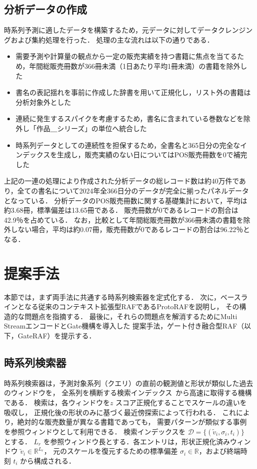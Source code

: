 \documentclass[twocolumn, lastpage]{jarticle}
\begin{document}
\subsection{分析データの作成}
時系列予測に適したデータを構築するため，元データに対してデータクレンジングおよび集約処理を行った．
処理の主な流れは以下の通りである．
    \begin{itemize}
        \item 需要予測や計算量の観点から一定の販売実績を持つ書籍に焦点を当てるため，年間総販売冊数が366冊未満（1日あたり平均1冊未満）の書籍を除外した
        \item 書名の表記揺れを事前に作成した辞書を用いて正規化し，リスト外の書籍は分析対象外とした
        \item 連続に発生するスパイクを考慮するため，書名に含まれている巻数などを除外し「作品＿シリーズ」の単位へ統合した
        \item 時系列データとしての連続性を担保するため，全書名と365日分の完全なインデックスを生成し，販売実績のない日についてはPOS販売冊数を0で補完した
    \end{itemize}
上記の一連の処理により作成された分析データの総レコード数は約40万件であり，全ての書名について2024年全366日分のデータが完全に揃ったパネルデータとなっている．
分析データのPOS販売冊数に関する基礎集計において，平均は約3.68冊，標準偏差は13.65冊である．
販売冊数が0であるレコードの割合は42.9％を占めている．
なお，比較として年間総販売冊数が366冊未満の書籍を除外しない場合，平均は約0.07冊，販売冊数が0であるレコードの割合は96.22％となる．





\section{提案手法}
本節では，まず両手法に共通する時系列検索器を定式化する．
次に，ベースラインとなる従来のコンテキスト拡張型RAFであるProtoRAFを説明し，
その構造的な問題点を指摘する．
最後に，それらの問題点を解消するためにMulti StreamエンコードとGate機構を導入した
提案手法，ゲート付き融合型RAF（以下，GateRAF）を提示する．


\subsection{時系列検索器}
時系列検索器は，予測対象系列（クエリ）の直前の観測値と形状が類似した過去のウィンドウを，
全系列を横断する検索インデックス~\cite{Johnson.2019}から高速に取得する機構である．
検索は，各ウィンドウを$z$ スコア正規化することでスケールの違いを吸収し，
正規化後の形状のみに基づく最近傍探索によって行われる．
これにより，絶対的な販売数量が異なる書籍であっても，
需要パターンが類似する事例を参照ウィンドウとして利用できる．
検索インデックスを $\mathcal{D} = \{(\tilde{v}_i, \sigma_i, t_i)\}$ とする．
$L_r$ を参照ウィンドウ長とする．各エントリは，形状正規化済みウィンドウ $\tilde{v}_i \in \mathbb{R}^{L_r}$，
元のスケールを復元するための標準偏差 $\sigma_i \in \mathbb{R}$，および終端時刻 $t_i$ から構成される．
\end{document}
